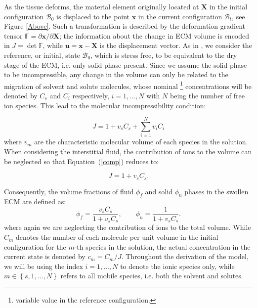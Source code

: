\documentclass[runningheads]{llncs}
\newcommand{\F}{\ensuremath{\mathbb{F}}}
\begin{document}
As the tissue deforms, the material element originally located at $\mathbf{X}$ in the initial configuration $\mathcal{B}_0$ is displaced to the point $\mathbf{x}$ in the current configuration $\mathcal{B}_t$, see Figure \ref{Above}. Such a transformation is described by the deformation gradient tensor $\F= \partial \mathbf{x}/\partial \mathbf{X}$; the information about the change in ECM volume is encoded in $J= \det \F$, while $\mathbf{u}= \mathbf{x}-\mathbf{X}$ is the displacement vector. As in \cite{sarah}, we consider the reference, or initial, state $\mathcal{B}_0$, which is stress free, to be equivalent to the dry stage of the ECM, i.e. only solid phase present. Since we assume the solid phase to be incompressible, any change in the volume can only be related to the migration of solvent and solute molecules, whose nominal \footnote{variable value in the reference configuration.} concentrations will be denoted by $C_s$ and $C_i$ respectively, $i=1,\ldots,N$ with $N$ being the number of free ion species. This lead to the molecular incompressibility condition:

\begin{equation}
 J= 1 + v_s C_s +\sum\limits_{i=1}^{N} v_i C_i
 \label{comp}
\end{equation}
where $v_m$ are the characteristic molecular volume of each species in the solution. When considering the interstitial fluid, the contribution of ions to the volume can be neglected \cite{ecm1,ecm2} so that Equation~(\ref{comp}) reduces to:

\begin{equation}
J=1+v_s C_s.
\label{inc}
\end{equation} 

Consequently, the volume fractions of fluid $\phi_f$ and solid $\phi_n$ phases in the swollen ECM are defined as:
\begin{equation}
\phi_f = \frac{v_sC_s}{1+v_sC_s}, \qquad \phi_n = \frac{1}{1+v_sC_s}.
\end{equation}
where again we are neglecting the contribution of ions to the total volume.
While $C_m$ denotes the number of each molecule per unit volume in the initial configuration for the $m$-th species in the solution, the actual concentration in the current state is denoted by $c_m=C_m/J$. Throughout the derivation of the model, we will be using the index $i=1,\ldots,N$ to denote the ionic species only, while $m\in\left\{s,1,\ldots,N\right\}$ refers to all mobile species, i.e. both the solvent and solutes.
\end{document}
